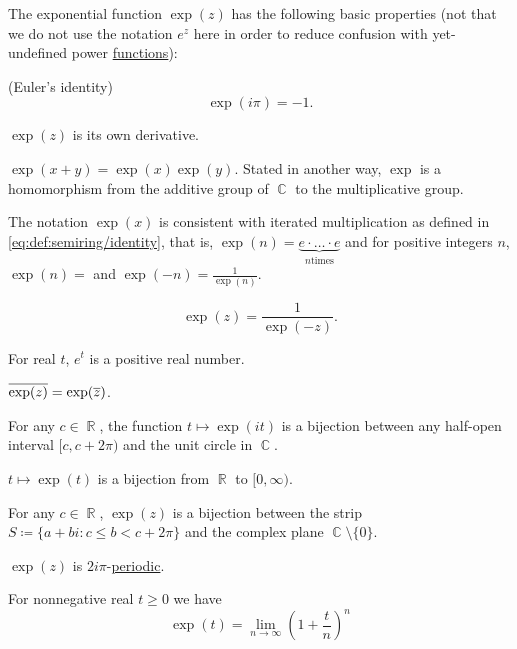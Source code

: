\begin{proposition}\label{thm:def:exponential_function}
  The exponential function \( \exp(z) \) has the following basic properties (not that we do not use the notation \( e^z \) here in order to reduce confusion with yet-undefined power \hyperref[def:power_function]{functions}):

  \begin{thmenum}

     (Euler's identity)
    \begin{equation*}
      \exp(i \pi) = -1.
    \end{equation*}

     \( \exp(z) \) is its own derivative.

     \( \exp(x + y) = \exp(x) \exp(y) \). Stated in another way, \( \exp \) is a homomorphism from the additive group of \( \BbbC \) to the multiplicative group.

     The notation \( \exp(x) \) is consistent with iterated multiplication as defined in \eqref{eq:def:semiring/identity}, that is, \( \exp(n) = \underbrace{e \cdot \ldots \cdot e}_{n \text{times}} \) and for positive integers \( n \), \( \exp(n) =  \) and \( \exp(-n) =\tfrac 1 {\exp(n)} \).

    \begin{equation*}
      \exp(z) = \frac 1 {\exp(-z)}.
    \end{equation*}

     For real \( t \), \( e^t \) is a positive real number.

     \( \oline{\exp(z)} = \exp(\oline{z}) \).

     For any \( c \in \BbbR \), the function \( t \mapsto \exp(it) \) is a bijection between any half-open interval \( [c, c + 2\pi) \) and the unit circle in \( \BbbC \).

     \( t \mapsto \exp(t) \) is a bijection from \( \BbbR \) to \( [0, \infty) \).

     For any \( c \in \BbbR \), \( \exp(z) \) is a bijection between the strip \( S \coloneqq \{ a + bi \colon c \leq b < c + 2\pi \} \) and the complex plane \( \BbbC \setminus \{ 0 \} \).

     \( \exp(z) \) is \( 2i\pi \)-\hyperref[def:periodic_function]{periodic}.

     For nonnegative real \( t \geq 0 \) we have
    \begin{equation*}
      \exp(t) = \lim_{n \to \infty} \left(1 + \frac t n \right)^n
    \end{equation*}
  \end{thmenum}
\end{proposition}
